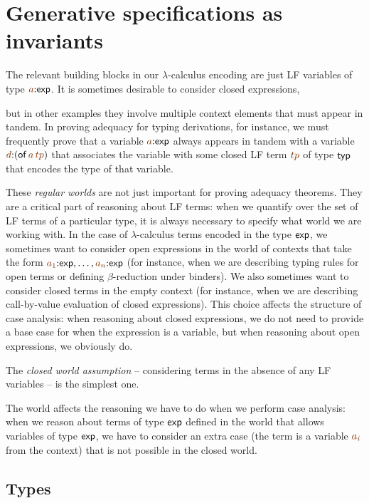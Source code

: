 \chapter{Generative specifications as invariants}
\label{chapter-genspec}

The relevant building blocks in our $\lambda$-calculus encoding are
just LF variables of type $\lf{a}{:}{\sf exp}$. It is sometimes
desirable to consider closed expressions, 



but in other examples they
involve multiple context elements that must appear in tandem. In
proving adequacy for typing derivations, for instance, we must
frequently prove that a variable $\lf{a}{:}{\sf exp}$ always appears
in tandem with a variable $\lf{d}{:}({\sf of}\,\lf{a}\,\lf{tp})$ that
associates the variable with some closed LF term $\lf{tp}$ of type
${\sf typ}$ that encodes the type of that variable.

These {\it regular worlds} are not just important for proving adequacy
theorems. They are a critical part of reasoning about LF terms: when
we quantify over the set of LF terms of a particular type, it is
always necessary to specify what world we are working with. In the
case of $\lambda$-calculus terms encoded in the type ${\sf exp}$, we
sometimes want to consider open expressions in the world of contexts
that take the form $\lf{a_1}{:}{\sf exp},\ldots,\lf{a_n}{:}{\sf exp}$
(for instance, when we are describing typing rules for open terms or
defining $\beta$-reduction under binders). We also sometimes want to
consider closed terms in the empty context (for instance, when we are
describing call-by-value evaluation of closed expressions).  This
choice affects the structure of case analysis: when reasoning
about closed expressions, we do not need to provide a base case for
when the expression is a variable, but when reasoning about open
expressions, we obviously do.

The {\it closed world assumption} -- considering terms in the absence
of any LF variables -- is the simplest one. 


The world affects the reasoning we have to do when we perform case
analysis: when we reason about terms of type ${\sf exp}$ defined in
the world that allows variables of type ${\sf exp}$, we have to
consider an extra case (the term is a variable $\lf{a_i}$ from the
context) that is not possible in the closed world. 

\section{Types}


